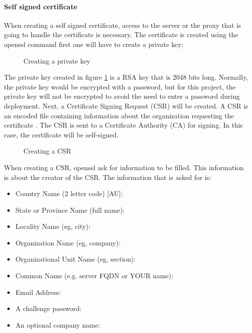 \paragraph{Self signed certificate}
When creating a self signed certificate, access to the server or the proxy that is going to handle the certificate is necessary.
The certificate is created using the openssl command first one will have to create a private key:
\begin{figure}[h]
    \begin{center}
    \end{center}
    \caption{Creating a private key}
    \label{fig:private-key}
\end{figure}
The private key created in figure \ref{fig:private-key} is a RSA key that is 2048 bits long. 
Normally, the private key would be encrypted with a password, but for this project, 
the private key will not be encrypted to avoid the need to enter a password during deployment.
Next, a Certificate Signing Request (CSR) will be created. 
A CSR is an encoded file containing information about the organization requesting the certificate \cite{csr}. 
The CSR is sent to a Certificate Authority (CA) for signing. In this case, the certificate will be self-signed.
\begin{figure}[h]
    \begin{center}
    \end{center}
    \caption{Creating a CSR}
    \label{fig:csr-creation}
\end{figure}
When creating a \ac{CSR}, openssl ask for information to be filled. This information is about the creator of the CSR.
The information that is asked for is:
\begin{itemize}
    \item Country Name (2 letter code) [AU]: 
    \item State or Province Name (full name): 
    \item Locality Name (eg, city): 
    \item Organization Name (eg, company): 
    \item Organizational Unit Name (eg, section): 
    \item Common Name (e.g. server FQDN or YOUR name): 
    \item Email Address:
    \item A challenge password:
    \item An optional company name:
\end{itemize}
